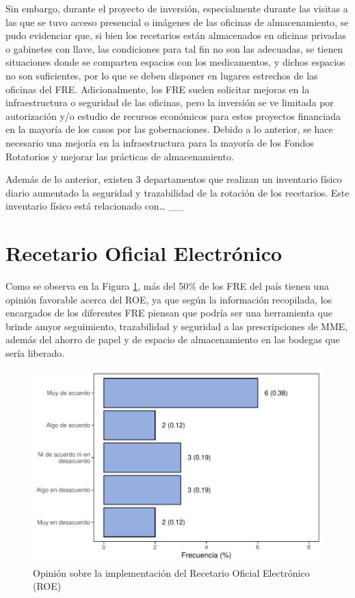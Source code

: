\documentclass[
]{book}
\begin{document}
Sin embargo, durante el proyecto de inversión, especialmente durante las visitas a las que se tuvo acceso presencial o imágenes de las oficinas de almacenamiento, se pudo evidenciar que, si bien los recetarios están almacenados en oficinas privadas o gabinetes con llave, las condiciones para tal fin no son las adecuadas, se tienen situaciones donde se comparten espacios con los medicamentos, y dichos espacios no son suficientes, por lo que se deben disponer en lugares estrechos de las oficinas del FRE. Adicionalmente, los FRE suelen solicitar mejoras en la infraestructura o seguridad de las oficinas, pero la inversión se ve limitada por autorización y/o estudio de recursos económicos para estos proyectos financiada en la mayoría de los casos por las gobernaciones. Debido a lo anterior, se hace necesario una mejoría en la infraestructura para la mayoría de los Fondos Rotatorios y mejorar las prácticas de almacenamiento.

Además de lo anterior, existen 3 departamentos que realizan un inventario físico diario aumentado la seguridad y trazabilidad de la rotación de los recetarios. Este inventario físico está relacionado con\ldots{} \_\_

\hypertarget{recetario-oficial-electruxf3nico}{%
\section{Recetario Oficial Electrónico}\label{recetario-oficial-electruxf3nico}}

Como se observa en la Figura \ref{fig:FREImplementacionROE}, más del 50\% de los FRE del país tienen una opinión favorable acerca del ROE, ya que según la información recopilada, los encargados de los diferentes FRE piensan que podría ser una herramienta que brinde amyor seguimiento, trazabilidad y seguridad a las prescripciones de MME, además del ahorro de papel y de espacio de almacenamiento en las bodegas que sería liberado.

\begin{figure}
\includegraphics[width=0.85\linewidth]{InformeFinal_files/figure-latex/FREImplementacionROE-1} \caption{Opinión sobre la implementación del Recetario Oficial Electrónico (ROE)}\label{fig:FREImplementacionROE}
\end{figure}
\end{document}
